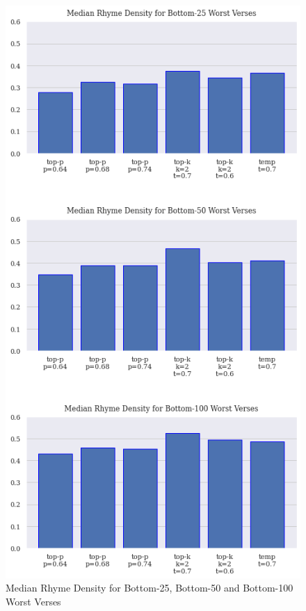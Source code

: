 \begin{figure}[h]
    \centering
    \includegraphics[scale=0.64,keepaspectratio=true]{figures/bot_verse_rd_median.png}
    \caption{Median Rhyme Density for Bottom-25, Bottom-50 and Bottom-100 Worst Verses}
    \label{fig:bot_rd_median}
\end{figure}